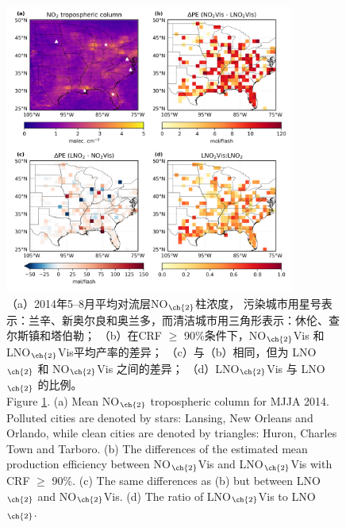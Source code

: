 \begin{figure}[H]
\centering
\includegraphics[width=0.85\textwidth]{./figures/us_delta.png}
\caption{（a）2014年5--8月平均对流层NO$_{\ch{2}}$柱浓度，
污染城市用星号表示：兰辛、新奥尔良和奥兰多，而清洁城市用三角形表示：休伦、查尔斯镇和塔伯勒；
（b）在CRF $\geq$ 90\%条件下，NO$_{\ch{2}}$Vis 和 LNO$_{\ch{2}}$Vis平均产率的差异；
（c）与（b）相同，但为 LNO$_{\ch{2}}$ 和 NO$_{\ch{2}}$Vis 之间的差异；
（d）LNO$_{\ch{2}}$Vis 与 LNO$_{\ch{2}}$ 的比例。\\
Figure \ref{fig:us_delta}.
(a) Mean NO$_{\ch{2}}$ tropospheric column for MJJA 2014.
Polluted cities are denoted by stars: Lansing, New Orleans and Orlando, while clean cities are denoted by triangles: Huron, Charles Town and Tarboro.
(b) The differences of the estimated mean production efficiency between NO$_{\ch{2}}$Vis and LNO$_{\ch{2}}$Vis with CRF $\geq$ 90\%.
(c) The same differences as (b) but between LNO$_{\ch{2}}$ and NO$_{\ch{2}}$Vis.
(d) The ratio of LNO$_{\ch{2}}$Vis to LNO$_{\ch{2}}$.
}
\label{fig:us_delta}
\end{figure}

